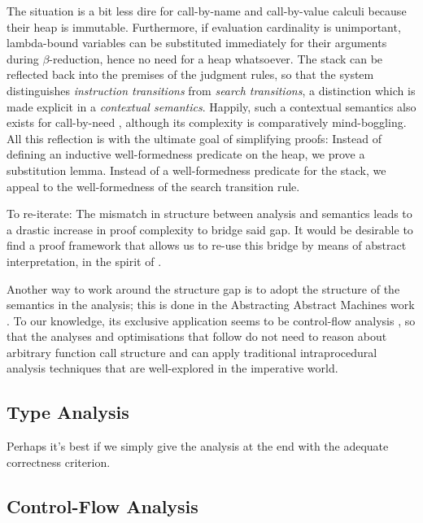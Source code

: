 The situation is a bit less dire for call-by-name and call-by-value calculi
because their heap is immutable. Furthermore, if evaluation cardinality is
unimportant, lambda-bound variables can be substituted immediately for their
arguments during $β$-reduction, hence no need for a heap whatsoever. The
stack can be reflected back into the premises of the judgment rules, so that
the system distinguishes \emph{instruction transitions} from \emph{search
transitions}, a distinction which is made explicit in a \emph{contextual
semantics}. Happily, such a contextual semantics also exists for call-by-need
\cite{Ariola:95}, although its complexity is comparatively mind-boggling.
All this reflection is with the ultimate goal of simplifying proofs: Instead
of defining an inductive well-formedness predicate on the heap, we prove a
substitution lemma. Instead of a well-formedness predicate for the stack, we
appeal to the well-formedness of the search transition rule.

To re-iterate: The mismatch in structure between analysis and semantics leads to
a drastic increase in proof complexity to bridge said gap. It would be desirable
to find a proof framework that allows us to re-use this bridge by means of
abstract interpretation, in the spirit of \citep{Cousot:21}.

Another way to work around the structure gap is to adopt the structure of the
semantics in the analysis; this is done in the Abstracting Abstract
Machines work \cite{aam}. To our knowledge, its exclusive application seems
to be control-flow analysis \cite{Shivers:91}, so that the analyses and
optimisations that follow do not need to reason about arbitrary function call
structure and can apply traditional intraprocedural analysis techniques that are
well-explored in the imperative world. 

\subsection{Type Analysis}

Perhaps it's best if we simply give the analysis at the end with the adequate
correctness criterion.

\subsection{Control-Flow Analysis}

